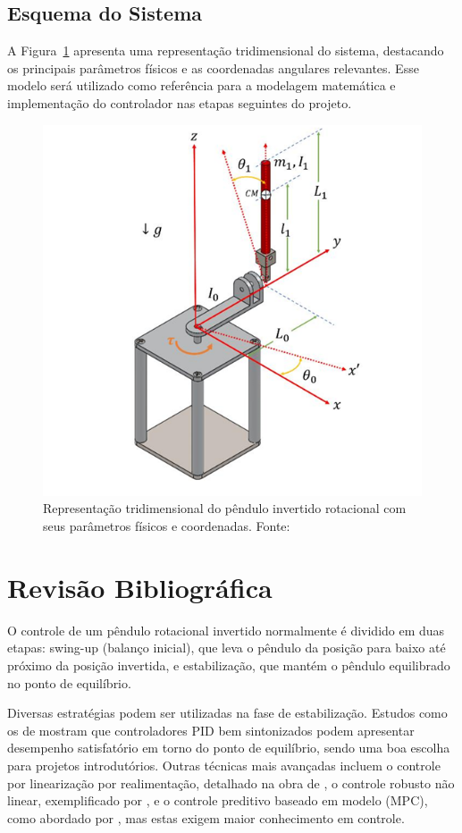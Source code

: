 \documentclass[9pt,a4paper,twocolumn,twoside]{tau-class/tau}
\begin{document}
    \subsection{Esquema do Sistema}
    
    A Figura~\ref{fig:esquema} apresenta uma representação tridimensional do sistema, destacando os principais parâmetros físicos e as coordenadas angulares relevantes. Esse modelo será utilizado como referência para a modelagem matemática e implementação do controlador nas etapas seguintes do projeto.
    
    \begin{figure}[H]
        \centering
        \includegraphics[width=0.85\columnwidth]{figures/pendulo com angulos.png}
        \caption{Representação tridimensional do pêndulo invertido rotacional com seus parâmetros físicos e coordenadas. Fonte: \cite{Duart2017}}
        \label{fig:esquema}
    \end{figure}
   

\section{Revisão Bibliográfica}

   O controle de um pêndulo rotacional invertido normalmente é dividido em duas etapas: swing-up (balanço inicial), que leva o pêndulo da posição para baixo até próximo da posição invertida, e estabilização, que mantém o pêndulo equilibrado no ponto de equilíbrio.

    Diversas estratégias podem ser utilizadas na fase de estabilização. Estudos como os de \cite{mathew2013} mostram que controladores PID bem sintonizados podem apresentar desempenho satisfatório em torno do ponto de equilíbrio, sendo uma boa escolha para projetos introdutórios. Outras técnicas mais avançadas incluem o controle por linearização por realimentação, detalhado na obra de \cite{spong2008}, o controle robusto não linear, exemplificado por \cite{Furuta1992}, e o controle preditivo baseado em modelo (MPC), como abordado por \cite{deepak2019l}, mas estas exigem maior conhecimento em controle.
\end{document}
